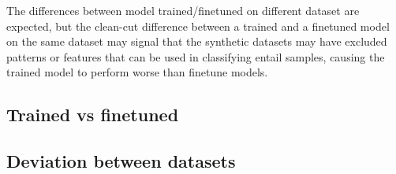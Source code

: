 \documentclass{article}
\begin{document}
The differences between model trained/finetuned on different dataset are expected, but the clean-cut difference between a trained and a finetuned model on the same dataset may signal that the synthetic datasets may have excluded patterns or features that can be used in classifying entail samples, causing the trained model to perform worse than finetune models.

\subsection{Trained vs finetuned}

\subsection{Deviation between datasets}
\end{document}
